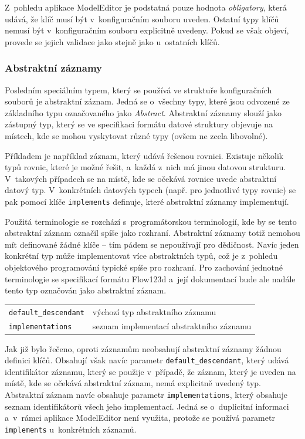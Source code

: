 \documentclass[FM,bw,DP]{tulthesis}
\begin{document}
Z~pohledu aplikace ModelEditor je podstatná pouze hodnota \textit{obligatory}, která udává, že klíč musí být v~konfiguračním souboru uveden. Ostatní typy klíčů nemusí být v~konfiguračním souboru explicitně uvedeny. Pokud se však objeví, provede se jejich validace jako stejně jako u~ostatních klíčů.

\subsubsection{Abstraktní záznamy}

Posledním speciálním typem, který se používá ve struktuře konfiguračních souborů je abstraktní záznam. Jedná se o~všechny typy, které jsou odvozené ze základního typu označovaného jako \textit{Abstract}. Abstraktní záznamy slouží jako zástupný typ, který se ve specifikaci formátu datové struktury objevuje na místech, kde se mohou vyskytovat různé typy (ovšem ne zcela libovolné).

Příkladem je například záznam, který udává řešenou rovnici. Existuje několik typů rovnic, které je možné řešit, a~každá z~nich má jinou datovou strukturu. V~takových případech se na místě, kde se očekává rovnice uvede abstraktní datový typ. V~konkrétních datových typech (např. pro jednotlivé typy rovnic) se pak pomocí klíče \texttt{implements} definuje, které abstraktní záznamy implementují.

Použitá terminologie se rozchází s~programátorskou terminologií, kde by se tento abstraktní záznam označil spíše jako rozhraní. Abstraktní záznamy totiž nemohou mít definované žádné klíče -- tím pádem se nepoužívají pro dědičnost. Navíc jeden konkrétní typ může implementovat více abstraktních typů, což je z~pohledu objektového programování typické spíše pro rozhraní. Pro zachování jednotné terminologie se specifikací formátu Flow123d a~její dokumentací bude ale nadále tento typ označován jako abstraktní záznam.

\vspace{0.5cm}
\begin{tabular}{m{5cm}@{}l}
\texttt{default\_descendant}\dotfill & výchozí typ abstraktního záznamu \\
\texttt{implementations}\dotfill & seznam implementací abstraktního záznamu \\
\end{tabular}
\vspace{0.5cm}

Jak již bylo řečeno, oproti záznamům neobsahují abstraktní záznamy žádnou definici klíčů. Obsahují však navíc parametr \texttt{default\_descendant}, který udává identifikátor záznamu, který se použije v~případě, že záznam, který je uveden na místě, kde se očekává abstraktní záznam, nemá explicitně uvedený typ. Abstraktní záznam navíc obsahuje parametr \texttt{implementations}, který obsahuje seznam identifikátorů všech jeho implementací. Jedná se o~duplicitní informaci a~v~rámci aplikace ModelEditor není využita, protože se používá parametr \texttt{implements} u~konkrétních záznamů.
\end{document}
